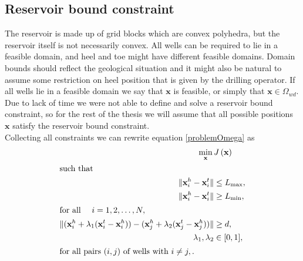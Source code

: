 \subsection{Reservoir bound constraint}
%
The reservoir is made up of grid blocks which are convex polyhedra,
but the reservoir itself is not necessarily convex. All 
wells can be required to lie in a feasible domain, and heel and 
toe might have different feasible domains. Domain bounds should
reflect the geological situation and it might also be natural to
assume some restriction on heel position that is given by the 
drilling operator. If all wells lie in a feasible domain
we say that $\textbf{x}$ is feasible, or simply that $\textbf{x} \in \Omega_{wd}$.
Due to lack of time we were not able to define and solve a reservoir
bound constraint, so for the rest of the thesis we will assume that
all possible positions $\textbf{x}$ satisfy the reservoir bound constraint.\\

%
Collecting all constraints we can rewrite equation \eqref{problemOmega} as
%
\begin{align}
\min_{\textbf{x}} \hspace{0.6mm} &J\left(\textbf{x}\right) \\
\intertext{such that}
\| \textbf{x}_i^h - \textbf{x}_i^t \| &\leq L_{\max}, \\
\| \textbf{x}_i^h - \textbf{x}_i^t \| &\geq L_{\min},\label{eq:min_non_convex} \\
\intertext{for all $\quad i = 1,2,\dots,N,$} 
\| (\textbf{x}_i^h + \lambda_1 (\textbf{x}_i^t - \textbf{x}_i^h  )) - (\textbf{x}_j^h + \lambda_2 (\textbf{x}_j^t - \textbf{x}_j^h)) \| &\geq d,\label{eq:dis_non_convex}\\
\quad \lambda_1, \lambda_2 &\in [0,1], \\
\intertext{for all pairs $(i,j) \text{ of wells with } i \neq j,.$} \nonumber
\end{align}
%
